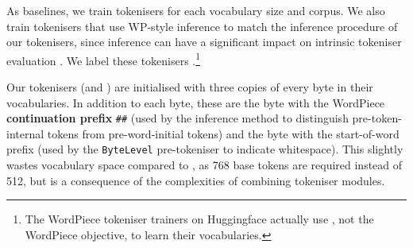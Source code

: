 As baselines, we train \bpe tokenisers for each vocabulary size and corpus. We also train \bpe tokenisers that use WP-style inference to match the inference procedure of our tokenisers, since inference can have a significant impact on intrinsic tokeniser evaluation \citep{uzan-etal-2024-greed}. We label these tokenisers \bpewp.\footnote{The WordPiece tokeniser trainers on Huggingface actually use \bpe, not the WordPiece objective, to learn their vocabularies.}

Our tokenisers (and \bpewp) are initialised with three copies of every byte in their vocabularies. In addition to each byte, these are the byte with the WordPiece \textbf{continuation prefix} \texttt{\#\#} (used by the inference method to distinguish pre-token-internal tokens from pre-word-initial tokens) and the byte with the start-of-word prefix (used by the \texttt{ByteLevel} pre-tokeniser to indicate whitespace). This slightly wastes vocabulary space compared to \bpe, as 768 base tokens are required instead of 512, but is a consequence of the complexities of combining tokeniser modules.

